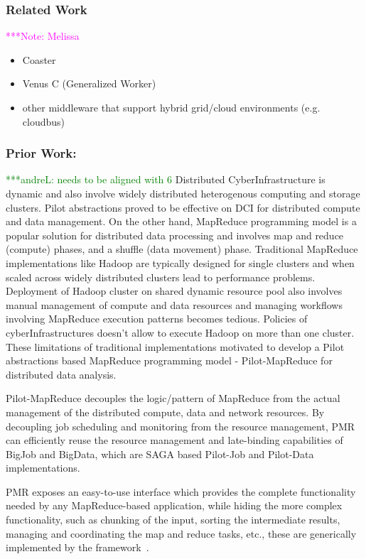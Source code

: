 \documentclass[times]{cpeauth}
\newcommand{\alnote}[1]{ {\textcolor{green} { ***andreL: #1 }}}
\newcommand{\note}[1]{ {\textcolor{magenta} { ***Note: #1 }}}
\newcommand{\alnote}[1]{}
\newcommand{\note}[1]{}
\begin{document}
\subsubsection*{Related Work} 
\note{Melissa}

\begin{itemize}
	\item Coaster
	\item Venus C (Generalized Worker)
	\item other middleware that support hybrid grid/cloud environments (e.g. cloudbus)
\end{itemize}

\subsubsection*{Prior Work:}
\alnote{needs to be aligned with 6}
Distributed CyberInfrastructure is dynamic and also involve widely distributed
heterogenous computing and storage clusters. Pilot abstractions proved to be
effective on DCI for distributed compute and data management. On the other
hand, MapReduce programming model is a popular solution for distributed data
processing and involves map and reduce (compute) phases, and a shuffle (data
movement) phase. Traditional MapReduce implementations like Hadoop are
typically designed for single clusters and when scaled across widely
distributed clusters lead to performance problems. Deployment of Hadoop
cluster on shared dynamic resource pool also involves manual management of
compute and data resources and managing workflows involving MapReduce
execution patterns becomes tedious. Policies of cyberInfrastructures doesn't
allow to execute Hadoop on more than one cluster. These limitations of
traditional implementations motivated to develop a Pilot abstractions based
MapReduce programming model - Pilot-MapReduce for distributed data analysis.

Pilot-MapReduce decouples the logic/pattern of MapReduce from the actual
management of the distributed compute, data and network resources. By
decoupling job scheduling and monitoring from the resource management, PMR can
efficiently reuse the resource management and late-binding capabilities of
BigJob and BigData, which are SAGA based Pilot-Job and Pilot-Data
implementations.

PMR exposes an easy-to-use interface which provides the complete functionality
needed by any MapReduce-based application, while hiding the more complex
functionality, such as chunking of the input, sorting the intermediate
results, managing and coordinating the map and reduce tasks, etc., these are
generically implemented by the
framework~\cite{Mantha:2012:PEF:2287016.2287020}.
\end{document}

